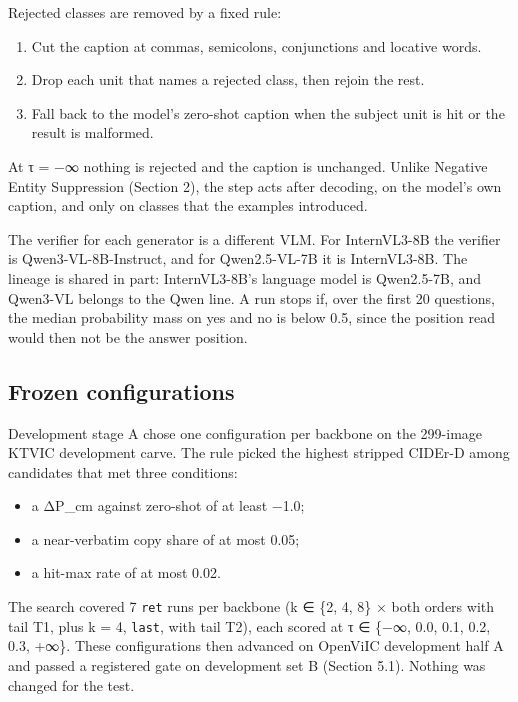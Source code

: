 Rejected classes are removed by a fixed rule:

\begin{enumerate}
\def\labelenumi{\arabic{enumi}.}
\tightlist
\item
  Cut the caption at commas, semicolons, conjunctions and locative words.
\item
  Drop each unit that names a rejected class, then rejoin the rest.
\item
  Fall back to the model's zero-shot caption when the subject unit is hit or the result is
  malformed.
\end{enumerate}

At τ = −∞ nothing is rejected and the caption is unchanged. Unlike Negative Entity Suppression
\citep{Lu2025NES} (Section 2), the step acts after decoding, on the model's own caption, and only on
classes that the examples introduced.

The verifier for each generator is a different VLM. For InternVL3-8B the verifier is
Qwen3-VL-8B-Instruct, and for Qwen2.5-VL-7B it is InternVL3-8B. The lineage is shared in part:
InternVL3-8B's language model is Qwen2.5-7B, and Qwen3-VL belongs to the Qwen line. A run stops if,
over the first 20 questions, the median probability mass on yes and no is below 0.5, since the
position read would then not be the answer position.

\subsection{Frozen configurations}\label{frozen-configurations}

Development stage A chose one configuration per backbone on the 299-image KTVIC development carve.
The rule picked the highest stripped CIDEr-D among candidates that met three conditions:

\begin{itemize}
\tightlist
\item
  a ΔP\_cm against zero-shot of at least −1.0;
\item
  a near-verbatim copy share of at most 0.05;
\item
  a hit-max rate of at most 0.02.
\end{itemize}

The search covered 7 \texttt{ret} runs per backbone (k ∈ \{2, 4, 8\} × both orders with tail T1,
plus k = 4, \texttt{last}, with tail T2), each scored at τ ∈ \{−∞, 0.0, 0.1, 0.2, 0.3, +∞\}. These
configurations then advanced on OpenViIC development half A and passed a registered gate on
development set B (Section 5.1). Nothing was changed for the test.

